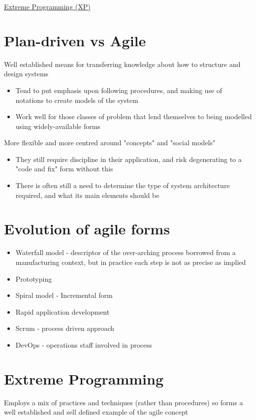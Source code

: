 \documentclass{article}[18pt]
\begin{document}
\begin{center}
\underline{\huge Extreme Programming (XP)}
\end{center}
\section{Plan-driven vs Agile}
\begin{definition}
Well established means for transferring knowledge about how to structure and design systems
\begin{itemize}
	\item Tend to put emphasis upon following procedures, and making use of notations to create models of the system
	\item Work well for those classes of problem that lend themselves to being modelled using widely-available forms
\end{itemize}
\end{definition}
\begin{definition}[Agile]
More flexible and more centred around "concepts" and "social models"
\begin{itemize}
	\item They still require discipline in their application, and risk degenerating to a "code and fix" form without this
	\item There is often still a need to determine the type of system architecture required, and what its main elements should be
\end{itemize}
\end{definition}
\section{Evolution of agile forms}
\begin{itemize}
	\item Waterfall model - descriptor of the over-arching process borrowed from a manufacturing context, but in practice each step is not as precise as implied
	\item Prototyping
	\item Spiral model - Incremental form
	\item Rapid application development
	\item Scrum - process driven approach
	\item DevOps - operations staff involved in process
\end{itemize}
\section{Extreme Programming}
Employs a mix of practices and techniques (rather than procedures) so forms a well established and sell defined example of the agile concept
\end{document}

